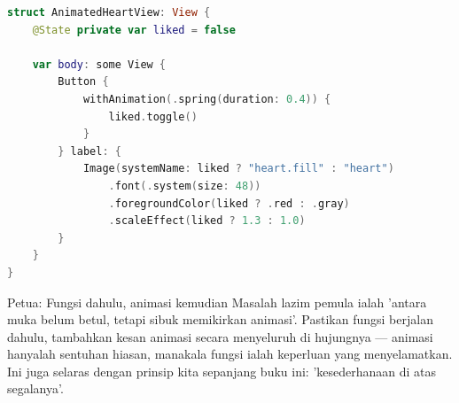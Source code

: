 \begin{lstlisting}[language=Swift]
struct AnimatedHeartView: View {
    @State private var liked = false

    var body: some View {
        Button {
            withAnimation(.spring(duration: 0.4)) {
                liked.toggle()
            }
        } label: {
            Image(systemName: liked ? "heart.fill" : "heart")
                .font(.system(size: 48))
                .foregroundColor(liked ? .red : .gray)
                .scaleEffect(liked ? 1.3 : 1.0)
        }
    }
}
\end{lstlisting}

\begin{tcbinfo}{Petua: Fungsi dahulu, animasi kemudian}
Masalah lazim pemula ialah 'antara muka belum betul, tetapi sibuk memikirkan animasi'. Pastikan fungsi berjalan dahulu, tambahkan kesan animasi secara menyeluruh di hujungnya — animasi hanyalah sentuhan hiasan, manakala fungsi ialah keperluan yang menyelamatkan. Ini juga selaras dengan prinsip kita sepanjang buku ini: 'kesederhanaan di atas segalanya'.

\end{tcbinfo}

